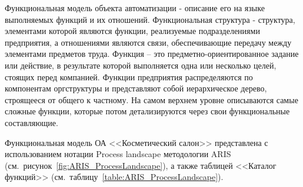 Функциональная модель объекта автоматизации - описание его на языке выполняемых функций и их отношений.
Функциональная структура - структура, элементами которой являются функции,
реализуемые подразделениями предприятия, а отношениями являются связи,
обеспечивающие передачу между элементами предметов труда.
Функция – это предметно-ориентированное задание или действие,
в результате которой выполняется одна или несколько целей, стоящих перед компанией.
Функции предприятия распределяются по компонентам оргструктуры и представляют собой иерархическое дерево,
строящееся от общего к частному.
На самом верхнем уровне описываются самые сложные функции,
которые потом детализируются через свои функциональные составляющие.

Функциональная модель ОА <<Косметический салон>> представлена
с использованием нотации Process landscape методологии ARIS
(см.~рисунок~\ref{fig:ARIS_ProcessLandscape}),
а также таблицей <<Каталог функций>>
(см.~таблицу~\ref{table:ARIS_ProcessLandscape}).



